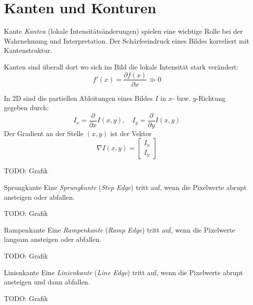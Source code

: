 \section{Kanten und Konturen}

\begin{defi}{Kante}
    \emph{Kanten} (lokale Intensitätsänderungen) spielen eine wichtige Rolle bei der Wahrnehmung und Interpretation.
    Der Schärfeeindruck eines Bildes korreliert mit Kantenstruktur.

    Kanten sind überall dort wo sich im Bild die lokale Intensität stark verändert:
    \[
        f'(x) = \frac{\partial f(x)}{\partial x} \gg 0
    \]

    In 2D sind die partiellen Ableitungen eines Bildes $I$ in $x$- bzw. $y$-Richtung gegeben durch:
    \[
        I_x = \frac{\partial}{\partial x} I(x, y), \quad I_y = \frac{\partial}{\partial y} I(x, y)
    \]
    Der Gradient an der Stelle $(x, y)$ ist der Vektor
    \[
        \nabla I(x, y) = \begin{bmatrix}
            I_x \\
            I_y
        \end{bmatrix}
    \]

    TODO: Grafik
\end{defi}

\begin{example}[Kante]{Sprungkante}
    Eine \emph{Sprungkante} (\emph{Step Edge}) tritt auf, wenn die Pixelwerte abrupt ansteigen oder abfallen.

    TODO: Grafik
\end{example}

\begin{example}[Kante]{Rampenkante}
    Eine \emph{Rampenkante} (\emph{Ramp Edge}) tritt auf, wenn die Pixelwerte langsam ansteigen oder abfallen.

    TODO: Grafik
\end{example}

\begin{example}[Kante]{Linienkante}
    Eine \emph{Linienkante} (\emph{Line Edge}) tritt auf, wenn die Pixelwerte abrupt ansteigen und dann abfallen.

    TODO: Grafik
\end{example}

